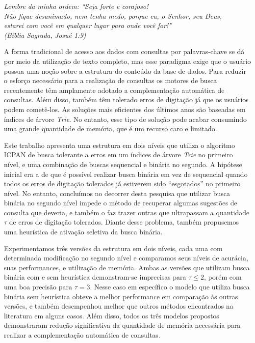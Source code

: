 \documentclass[
	12pt,				%
	openright,			%
	twoside,			%
	a4paper,			%
	english,			%
	spanish,			%
	brazil,				%
	]{abntex2}
\begin{document}

\begin{epigrafe}
    \vspace*{\fill}
	\begin{flushright}
		\textit{
		Lembre da minha ordem: ``Seja forte e corajoso!
		\\ Não fique desanimado, nem tenha medo, porque eu, o Senhor, seu Deus,
		\\ estarei com você em  qualquer lugar para onde você for!''
		\\ (Bíblia Sagrada, Josué 1:9)}
	\end{flushright}
\end{epigrafe}
\newpage
\newpage


\begin{resumo}
A forma tradicional de acesso aos dados com consultas por palavras-chave se dá por meio da utilização de texto completo, mas esse paradigma exige que o usuário possua uma noção sobre a estrutura do conteúdo da base de dados. Para reduzir o esforço necessário para a realização de consultas os motores de busca recentemente têm amplamente adotado a complementação automática de consultas. Além disso, também têm tolerado erros de digitação já que os usuários podem cometê-los. As soluções mais eficientes dos últimos anos são baseadas em índices de árvore \textit{Trie}. No entanto, esse tipo de solução pode acabar consumindo uma grande quantidade de memória, que é um recurso caro e limitado.

Este trabalho apresenta uma estrutura em dois níveis que utiliza o algoritmo ICPAN de busca tolerante a erros em um índices de árvore \textit{Trie} no primeiro nível, e uma combinação de buscas sequencial e binária no segundo. A hipótese inicial era a de que é possível realizar busca binária em vez de sequencial quando todos os erros de digitação tolerados já estiverem sido ``esgotados'' no primeiro nível. No entanto, concluímos no decorrer desta pesquisa que utilizar busca binária no segundo nível impede o método de recuperar algumas sugestões de consulta que deveria, e também o faz trazer outras que ultrapassam a quantidade $\tau$ de erros de digitação tolerados. Diante desse problema, também propusemos uma heurística de ativação seletiva da busca binária. 

Experimentamos três versões da estrutura em dois níveis, cada uma com determinada modificação no segundo nível e comparamos seus níveis de acurácia, suas performances, e utilização de memória. Ambas as versões que utilizam busca binária com e sem heurística demonstram-se imprecisas para $\tau \leq 2$, porém com uma boa precisão para $\tau=3$. Nesse caso em específico o modelo que utiliza busca binária sem heurística obteve a melhor performance em comparação às outras versões, e também desempenhou melhor que outros métodos encontrados na literatura em alguns casos. Além disso, todos os três modelos propostos demonstraram redução significativa da quantidade de memória necessária para realizar a complementação automática de consultas.


\end{resumo}
\end{document}
